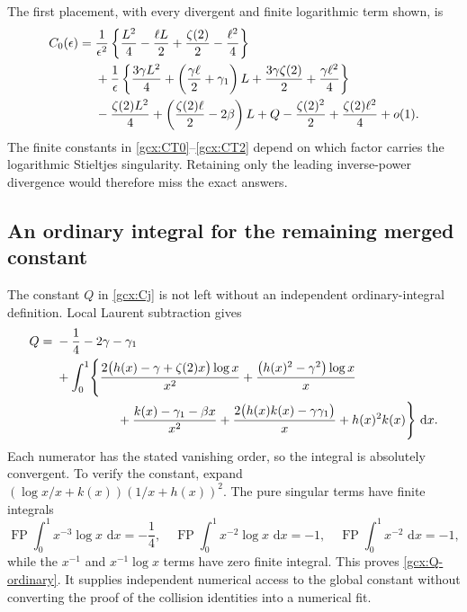 \documentclass[11pt]{article}
\numberwithin{equation}{section}
\theoremstyle{plain}
\theoremstyle{definition}
\theoremstyle{remark}
\DeclareMathOperator{\FP}{FP}
\newcommand{\dd}{\,\mathrm d}
\begin{document}
The first placement, with every divergent and finite logarithmic term
shown, is
\begin{align}
 C_0(\epsilon)={}&\frac1{\epsilon^2}
  \left\{\frac{L^2}{4}-\frac{\ell L}{2}
                  +\frac{\zeta(2)}2-\frac{\ell^2}{4}\right\}\notag\\
 &+\frac1\epsilon\left\{
       \frac{3\gamma L^2}{4}
       +\left(\frac{\gamma\ell}{2}+\gamma_1\right)L
       +\frac{3\gamma\zeta(2)}2+\frac{\gamma\ell^2}{4}\right\}\notag\\
 &-\frac{\zeta(2)L^2}{4}
       +\left(\frac{\zeta(2)\ell}{2}-2\beta\right)L
       +Q-\frac{\zeta(2)^2}{2}
                +\frac{\zeta(2)\ell^2}{4}+o(1).
 \label{gcx:C0-expansion}
\end{align}
The finite constants in \eqref{gcx:CT0}--\eqref{gcx:CT2} depend on which
factor carries the logarithmic Stieltjes singularity.  Retaining only
the leading inverse-power divergence would therefore miss the exact
answers.

\subsection{An ordinary integral for the remaining merged constant}

The constant $Q$ in \eqref{gcx:Cj} is not left without an independent
ordinary-integral definition.  Local Laurent subtraction gives
\begin{align}
 Q={}&-\frac14-2\gamma-\gamma_1\notag\\
 &+\int_0^1\Biggl\{
 \frac{2\bigl(h(x)-\gamma+\zeta(2)x\bigr)\log x}{x^2}
 +\frac{\bigl(h(x)^2-\gamma^2\bigr)\log x}{x}\notag\\
 &\hspace{17mm}+\frac{k(x)-\gamma_1-\beta x}{x^2}
 +\frac{2\bigl(h(x)k(x)-\gamma\gamma_1\bigr)}x
 +h(x)^2k(x)\Biggr\}\,\dd x.
 \label{gcx:Q-ordinary}
\end{align}
Each numerator has the stated vanishing order, so the integral is
absolutely convergent.  To verify the constant, expand
$(\log x/x+k(x))(1/x+h(x))^2$.  The pure singular terms have finite
integrals
\[
 \FP\int_0^1x^{-3}\log x\,\dd x=-\frac14,\quad
 \FP\int_0^1x^{-2}\log x\,\dd x=-1,\quad
 \FP\int_0^1x^{-2}\,\dd x=-1,
\]
while the $x^{-1}$ and $x^{-1}\log x$ terms have zero finite integral.
This proves \eqref{gcx:Q-ordinary}.  It supplies independent numerical
access to the global constant without converting the proof of the
collision identities into a numerical fit.

\end{document}
